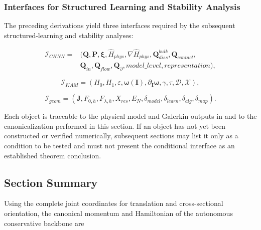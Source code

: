 \subsubsection{Interfaces for Structured Learning and Stability Analysis}\label{sec:hamiltonian-3-7-7}

The preceding derivations yield three interfaces required by the subsequent structured-learning and stability analyses:

\begin{equation}
\label{eq:hamiltonian-3-102}
\begin{aligned}
\mathcal{I}_{CHNN}={}&\bigl(\mathbf{Q},\mathbf{P},\bm{\xi},{\widehat{H}}_{phys},\nabla{\widehat{H}}_{phys},\mathbf{Q}_{diss}^{bulk},\mathbf{Q}_{contact},\\
&\mathbf{Q}_{in},\mathbf{Q}_{flow},\mathbf{Q}_{\partial},model\_ level,representation\bigr),
\end{aligned}
\end{equation}

\begin{equation}
\label{eq:hamiltonian-3-103}
\mathcal{I}_{KAM} = \left( H_{0},H_{1},\varepsilon,\bm{\omega}\left( \mathbf{I} \right),\partial_{\mathbf{I}}\bm{\omega},\gamma,\tau,\mathcal{D},\mathcal{X} \right),
\end{equation}

\begin{equation}
\label{eq:hamiltonian-3-104}
\mathcal{I}_{geom} = \left( \mathbf{J},F_{0,h},F_{\lambda,h},X_{res},E_{N},\delta_{model},\delta_{learn},\delta_{alg},\delta_{map} \right).
\end{equation}

Each object is traceable to the physical model and Galerkin outputs in  and to the canonicalization performed in this section. If an object has not yet been constructed or verified numerically, subsequent sections may list it only as a condition to be tested and must not present the conditional interface as an established theorem conclusion.

\subsection{Section Summary}\label{sec:hamiltonian-3-8}

Using the complete joint coordinates for translation and cross-sectional orientation, the canonical momentum and Hamiltonian of the autonomous conservative backbone are

